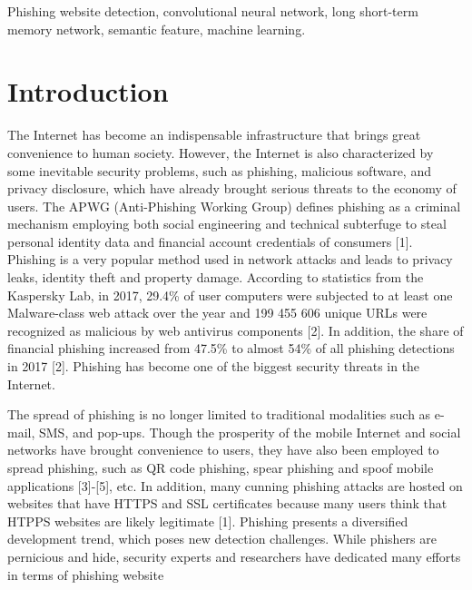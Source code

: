 \documentclass{ieeeaccess}
\begin{document}
\begin{keywords}
Phishing website detection, convolutional neural network, long short-term memory
network, semantic feature, machine learning.
\end{keywords}

\titlepgskip=-35pt

\maketitle

\section{Introduction}
The Internet has become an indispensable infrastructure
that brings great convenience to human society. However,
the Internet is also characterized by some inevitable security
problems, such as phishing, malicious software, and privacy
disclosure, which have already brought serious threats to
the economy of users. The APWG (Anti-Phishing Working
Group) defines phishing as a criminal mechanism employing
both social engineering and technical subterfuge to steal
personal identity data and financial account credentials of
consumers [1]. Phishing is a very popular method used in
network attacks and leads to privacy leaks, identity theft and
property damage. According to statistics from the Kaspersky
Lab, in 2017, 29.4\% of user computers were subjected to
at least one Malware-class web attack over the year and
199 455 606 unique URLs were recognized as malicious
by web antivirus components [2]. In addition, the share of financial phishing increased from 47.5\% to almost 54\% of
all phishing detections in 2017 [2]. Phishing has become one
of the biggest security threats in the Internet.\par
The spread of phishing is no longer limited to traditional
modalities such as e-mail, SMS, and pop-ups. Though
the prosperity of the mobile Internet and social networks
have brought convenience to users, they have also been
employed to spread phishing, such as QR code phishing,
spear phishing and spoof mobile applications [3]-[5],
etc. In addition, many cunning phishing attacks are hosted
on websites that have HTTPS and SSL certificates because
many users think that HTPPS websites are likely legitimate
[1]. Phishing presents a diversified development trend,
which poses new detection challenges. While phishers
are pernicious and hide, security experts and researchers
have dedicated many efforts in terms of phishing website
\end{document}
